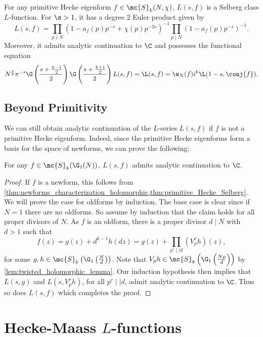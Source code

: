       \begin{theorem}\label{thm:primitive_Hecke_Selberg}
        For any primitive Hecke eigenform $f \in \mc{S}_{k}(N,\chi)$, $L(s,f)$ is a Selberg class $L$-function. For $\s > 1$, it has a degree $2$ Euler product given by 
        \[
          L(s,f) = \prod_{p \nmid N}(1-a_{f}(p)p^{-s}+\chi(p)p^{-2s})^{-1}\prod_{p \mid N}(1-a_{f}(p)p^{-s})^{-1}.
        \]
        Moreover, it admits analytic continuation to $\C$ and possesses the functional equation
        \[
          N^{\frac{s}{2}}\pi^{-s}\G\left(\frac{s+\frac{k-1}{2}}{2}\right)\G\left(\frac{s+\frac{k+1}{2}}{2}\right)L(s,f) = \L(s,f) = \w_{N}(f)i^{k}\L(1-s,\conj{f}).
        \]
      \end{theorem}
    \subsection*{Beyond Primitivity}
      We can still obtain analytic continuation of the $L$-series $L(s,f)$ if $f$ is not a primitive Hecke eigenform. Indeed, since the primitive Hecke eigenforms form a basis for the space of newforms, we can prove the following:

      \begin{theorem}\label{thm:analytic_continuation_Hecke}
        For any $f \in \mc{S}_{k}(\G_{1}(N))$, $L(s,f)$ admits analytic continuation to $\C$.
      \end{theorem}
      \begin{proof}
        If $f$ is a newform, this follows from \cref{thm:newforms_characterization_holomorphic,thm:primitive_Hecke_Selberg}. We will prove the case for oldforms by induction. The base case is clear since if $N = 1$ there are no oldforms. So assume by induction that the claim holds for all proper divisors of $N$. As $f$ is an oldform, there is a proper divisor $d \mid N$ with $d > 1$ such that
        \[
          f(z) = g(z)+d^{k-1}h(dz) = g(z)+\prod_{p^{r} \mid\mid d}(V_{p}^{r}h)(z),
        \]
        for some $g,h \in \mc{S}_{k}\left(\G_{1}\left(\frac{N}{d}\right)\right)$. Note that $V_{p}h \in \mc{S}_{k}\left(\G_{1}\left(\frac{Np}{d}\right)\right)$ by \cref{lem:twisted_holomorphic_lemma}. Our induction hypothesis then implies that $L(s,g)$ and $L(s,V_{p}^{r}h)$, for all $p^{r} \mid\mid d$, admit analytic continuation to $\C$. Thus so does $L(s,f)$ which completes the proof.
      \end{proof}
  \section{Hecke-Maass \texorpdfstring{$L$}{L}-functions}
